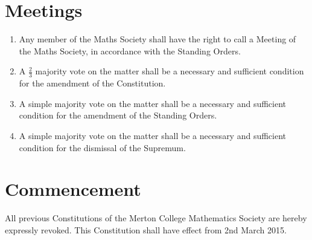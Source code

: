 \documentclass[pdftex,a4paper]{report}
\begin{document}
\section*{Meetings}

\begin{enumerate}[label=\Roman*)]
	\item Any member of the Maths Society shall have the right to call a Meeting of the Maths Society, in accordance with the Standing Orders.
	\item A $\frac{2}{3}$ majority vote on the matter shall be a necessary and sufficient condition for the amendment of the Constitution.
	\item A simple majority vote on the matter shall be a necessary and sufficient condition for the amendment of the Standing Orders.
	\item A simple majority vote on the matter shall be a necessary and sufficient condition for the dismissal of the Supremum.
\end{enumerate}

\section*{Commencement}

All previous Constitutions of the Merton College Mathematics Society are hereby expressly revoked. This Constitution shall have effect from 2nd March 2015.
\end{document}
